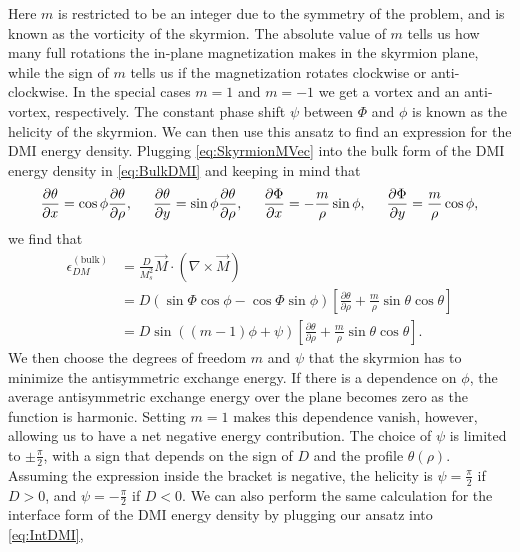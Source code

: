 \documentclass[1p]{elsarticle}		%
\numberwithin{equation}{section}
\begin{document}
Here $m$ is restricted to be an integer due to the symmetry of the problem, and is known as the vorticity of the skyrmion. The absolute value of $m$ tells us how many full rotations the in-plane magnetization makes in the skyrmion plane, while the sign of $m$ tells us if the magnetization rotates clockwise or anti-clockwise. In the special cases $m=1$ and $m=-1$ we get a vortex and an anti-vortex, respectively. The constant phase shift $\psi$ between $\Phi$ and $\phi$ is known as the helicity of the skyrmion. We can then use this ansatz to find an expression for the DMI energy density. Plugging \eqref{eq:SkyrmionMVec} into the bulk form of the DMI energy density in \eqref{eq:BulkDMI} and keeping in mind that
\begin{align}
\frac{\partial \theta}{\partial x} = \cos\phi \frac{\partial\theta}{\partial\rho}, \hspace{5mm}
\frac{\partial \theta}{\partial y} = \sin\phi \frac{\partial\theta}{\partial\rho}, \hspace{5mm}
\frac{\partial \Phi}{\partial x} = -\frac{m}{\rho}\sin\phi, \hspace{5mm}
\frac{\partial \Phi}{\partial y} = \frac{m}{\rho}\cos\phi,
\end{align}
we find that
\begin{align}
\nonumber \epsilon_{DM}^{(\text{bulk})} &= \frac{D}{M_s^2} \vec{M}\cdot(\nabla\times\vec{M}) \\
\nonumber &= D\left(\sin\Phi\cos\phi-\cos\Phi\sin\phi\right)\left[\frac{\partial\theta}{\partial\rho}+\frac{m}{\rho}\sin\theta\cos\theta\right] \\
&= D\sin((m-1)\phi+\psi)\left[\frac{\partial\theta}{\partial\rho}+\frac{m}{\rho}\sin\theta\cos\theta\right].\label{eq:BulkDMIepsilon}
\end{align}
We then choose the degrees of freedom $m$ and $\psi$ that the skyrmion has to minimize the antisymmetric exchange energy. If there is a dependence on $\phi$, the average antisymmetric exchange energy over the plane becomes zero as the function is harmonic. Setting $m=1$ makes this dependence vanish, however, allowing us to have a net negative energy contribution. The choice of $\psi$ is limited to $\pm \frac{\pi}{2}$, with a sign that depends on the sign of $D$ and the profile $\theta(\rho)$. Assuming the expression inside the bracket is negative, the helicity is $\psi = \frac{\pi}{2}$ if $D>0$, and $\psi = -\frac{\pi}{2}$ if $D<0$. We can also perform the same calculation for the interface form of the DMI energy density by plugging our ansatz into \eqref{eq:IntDMI},
\end{document}
